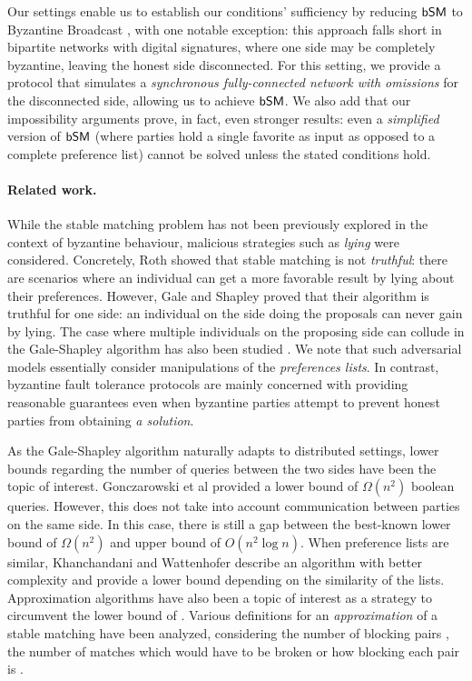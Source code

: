 Our settings enable us to establish our conditions' sufficiency by reducing $\textsf{bSM}$ to Byzantine Broadcast \cite{LSP82}, with one notable exception: this approach falls short in bipartite networks with digital signatures, where one side may be completely byzantine, leaving the honest side disconnected. For this setting, we provide a protocol that simulates a \emph{synchronous fully-connected network with omissions} for the disconnected side, allowing us to achieve $\textsf{bSM}$.
We also add that our impossibility arguments prove, in fact, even stronger results: even a \emph{simplified} version of $\textsf{bSM}$ (where parties hold a single favorite as input as opposed to a complete preference list) cannot be solved unless the stated conditions hold.

\paragraph{Related work.}
While the stable matching problem has not been previously explored in the context of byzantine behaviour, malicious strategies such as \emph{lying} were considered. Concretely, Roth \cite{Roth1982TheEO} showed that stable matching is not \emph{truthful}: there are scenarios where an individual can get a more favorable result by lying about their preferences. However, Gale and Shapley \cite{GaleShapley} proved that their algorithm is truthful for one side: an individual on the side doing the proposals can never gain by lying. The case where multiple individuals on the proposing side can collude in the Gale-Shapley algorithm has also been studied \cite{HuChi06}. We note that such adversarial models essentially consider manipulations of the \emph{preferences lists}. In contrast, byzantine fault tolerance protocols are mainly concerned with providing reasonable guarantees even when byzantine parties attempt to prevent honest parties from obtaining \emph{a solution}.


As the Gale-Shapley algorithm \cite{GaleShapley} naturally adapts to distributed settings, lower bounds regarding the number of queries between the two sides have been the topic of interest. Gonczarowski et al \cite{GONCZAROWSKI2019626} provided a lower bound of  $\Omega(n^2)$ boolean queries. However, this does not take into account communication between parties on the same side. In this case, there is still a gap between the best-known lower bound of $\Omega(n^2)$ and upper bound of $O(n^2 \log n)$. When preference lists are similar, Khanchandani and Wattenhofer \cite{Khanchandani2016DistributedSM} describe an algorithm with better complexity and provide a lower bound depending on the similarity of the lists.
Approximation algorithms have also been a topic of interest as a strategy to circumvent the lower bound of \cite{GONCZAROWSKI2019626}. Various definitions for an \emph{approximation} of a stable matching have been analyzed, considering the number of blocking pairs \cite{Ostrovsky}, the number of matches which would have to be broken \cite{GONCZAROWSKI2019626} or how blocking each pair is \cite{Kipnis}. 




